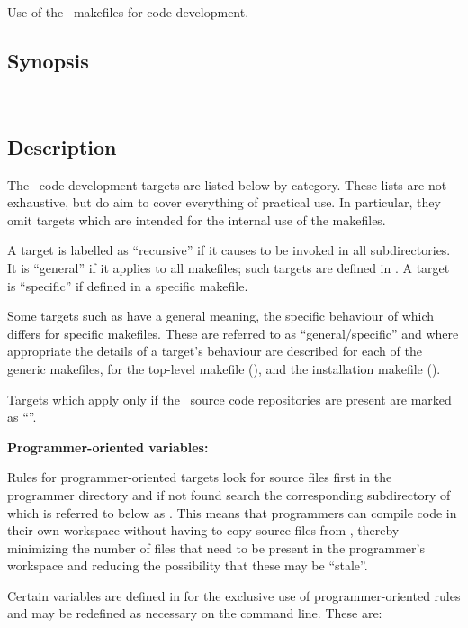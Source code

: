 Use of the \aipspp\ makefiles for code development.

\subsection*{Synopsis}

\begin{synopsis}
   \\
\end{synopsis}

\subsection*{Description}

The \aipspp\ code development targets are listed below by category.  These
lists are not exhaustive, but do aim to cover everything of practical use.  In
particular, they omit targets which are intended for the internal use of the
makefiles.

A target is labelled as ``recursive'' if it causes  to be
invoked in all subdirectories.  It is ``general'' if it applies to all
makefiles; such targets are defined in .  A target is
``specific'' if defined in a specific makefile.

Some targets such as  have a general meaning, the specific
behaviour of which differs for specific makefiles.  These are referred to as
``general/specific'' and where appropriate the details of a target's behaviour
are described for each of the generic makefiles, for the top-level makefile
(), and the installation makefile ().

Targets which apply only if the \rcs\ source code repositories are present
are marked as ``\rcs''.

\textbf{Programmer-oriented variables:}

Rules for programmer-oriented targets look for source files first in the
programmer directory and if not found search the corresponding subdirectory of
 which is referred to below as .  This means
that programmers can compile code in their own workspace without having to
copy source files from , thereby minimizing the number of
files that need to be present in the programmer's workspace and reducing the
possibility that these may be ``stale''.

Certain variables are defined in  for the exclusive use of
programmer-oriented rules and may be redefined as necessary on the
 command line.  These are:

